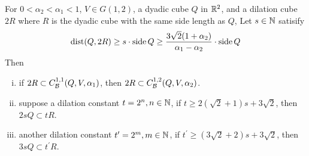 \begin{lemma}
    For $0<\alpha_2<\alpha_1<1$, $V\in G(1, 2)$, a dyadic cube $Q$ in $\mathbb{R}^2$, and a dilation cube $2R$ where $R$ is the dyadic cube with the same side length as $Q$, Let $s\in\mathbb{N}$ satisify
    \begin{equation}
        \operatorname{dist}(Q, 2R)\geq s\cdot \operatorname{side} Q \geq \frac{3\sqrt{2}(1+\alpha_2)}{\alpha_1-\alpha_2}\cdot \operatorname{side} Q
    \end{equation}
    Then
    \begin{enumerate}[(i)]
        \item  if $2R\subset C_\mathcal B^{1,1}(Q, V, \alpha_1)$, then $2R\subset  C_\mathcal B^{1,2}(Q, V, \alpha_2)$.
        \item  suppose a dilation constant $t = 2^n, n\in\mathbb{N}$, if $t\geq 2(\sqrt{2}+1)s + 3\sqrt{2}$, then $2sQ\subset tR $.
        \item  another dilation constant $t^\prime = 2^m, m\in\mathbb{N}$, if $t^\prime \geq (3\sqrt{2}+2)s + 3\sqrt{2}$, then $3sQ\subset t^\prime R$.
    \end{enumerate}
\end{lemma}
